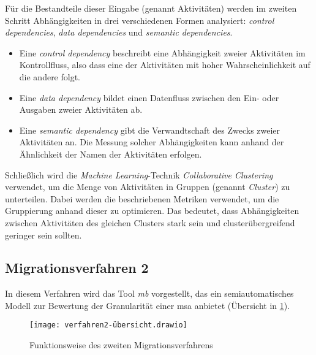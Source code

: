 Für die Bestandteile dieser Eingabe (genannt Aktivitäten) werden im zweiten Schritt Abhängigkeiten in drei verschiedenen Formen analysiert: \emph{control dependencies}, \emph{data dependencies} und \emph{semantic dependencies}.
\begin{itemize}
	\item Eine \emph{control dependency} beschreibt eine Abhängigkeit zweier Aktivitäten im Kontrollfluss, also dass eine der Aktivitäten mit hoher Wahrscheinlichkeit auf die andere folgt.
	\item Eine \emph{data dependency} bildet einen Datenfluss zwischen den Ein- oder Ausgaben zweier Aktivitäten ab.
	\item Eine \emph{semantic dependency} gibt die Verwandtschaft des Zwecks zweier Aktivitäten an.
	Die Messung solcher Abhängigkeiten kann anhand der Ähnlichkeit der Namen der Aktivitäten erfolgen.
\end{itemize}

Schließlich wird die \emph{Machine Learning}-Technik \emph{Collaborative Clustering} verwendet, um die Menge von Aktivitäten in Gruppen (genannt \emph{Cluster}) zu unterteilen.
Dabei werden die beschriebenen Metriken verwendet, um die Gruppierung anhand dieser zu optimieren.
Das bedeutet, dass Abhängigkeiten zwischen Aktivitäten des gleichen Clusters stark sein und clusterübergreifend geringer sein sollten.

\subsection{Migrationsverfahren 2}

In diesem Verfahren wird das Tool \emph{\acrfull{mb}} vorgestellt, das ein semiautomatisches Modell zur Bewertung der Granularität einer \gls{msa} anbietet (Übersicht in \cref{fig:interviews-migrationsverfahren2}).

\begin{figure}[!ht]
	\centering
	\texttt{[image: verfahren2-übersicht.drawio]}
	\caption[Funktionsweise Migrationsverfahren 2]{
		Funktionsweise des zweiten Migrationsverfahrens
	}
	\label{fig:interviews-migrationsverfahren2}
\end{figure} 

